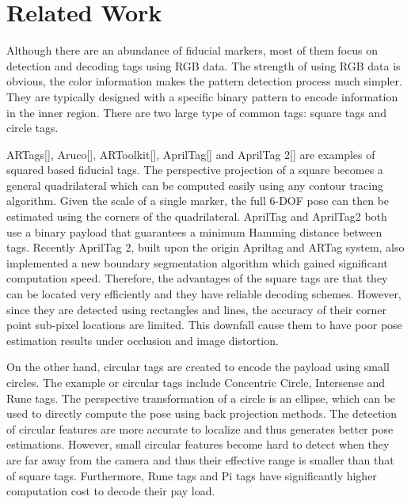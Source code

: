 \section{Related Work}
\label{sec:related}
	Although there are an abundance of fiducial markers, most of them focus on detection and decoding tags using RGB data. The strength of using RGB data is obvious, the color information makes the pattern detection process much simpler.     
	They are typically designed with a specific binary pattern to encode information in the inner region. There are two large type of common tags: square tags and circle tags. 
	
	ARTags[], Aruco[], ARToolkit[], AprilTag[] and AprilTag 2[] are examples of squared based fiducial tags. The perspective projection of a square becomes a general quadrilateral which can be computed easily using any contour tracing algorithm. Given the scale of a single marker, the full 6-DOF pose can then be estimated using the corners of the quadrilateral. AprilTag and AprilTag2 both use a binary payload that guarantees a minimum Hamming distance between tags.  Recently AprilTag 2, built upon the origin Apriltag and ARTag system, also implemented a new boundary segmentation algorithm which gained significant computation speed. Therefore, the advantages of the square tags are that they can be located very efficiently and they have reliable decoding schemes. However, since they are detected using rectangles and lines, the accuracy of their corner point sub-pixel locations are limited. This downfall cause them to have poor pose estimation results under occlusion and image distortion.
	
	On the other hand, circular tags are created to encode the payload using small circles. The example or circular tags include Concentric Circle, Intersense and Rune tags. The perspective transformation of a circle is an ellipse, which can be used to directly compute the pose using back projection methods. The detection of circular features are more accurate to localize and thus generates better pose estimations. However, small circular features become hard to detect when they are far away from the camera and thus their effective range is smaller than that of square tags. Furthermore, Rune tags and Pi tags have significantly higher computation cost to decode their pay load. 